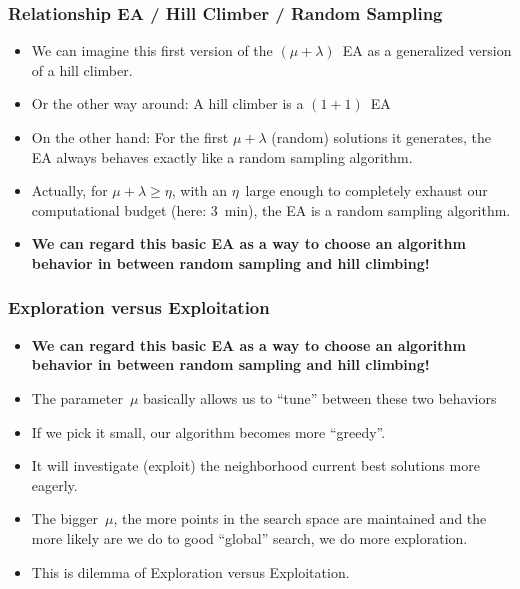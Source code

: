 \documentclass[mathserif]{beamer}%
\begin{document}
\begin{frame}[t]%
\frametitle{Relationship EA / Hill Climber / Random Sampling}%
\begin{itemize}%
\item We can imagine this first version of the $(\mu+\lambda)$~EA as a generalized version of a hill climber.%
\item<2-> Or the other way around: A hill climber is a $(1+1)$~EA%
%
\item<6-> On the other hand: For the first $\mu+\lambda$ (random) solutions it generates, the EA always behaves exactly like a random sampling algorithm.%
%
\item<8-> Actually, for $\mu+\lambda\geq \eta$, with an $\eta$~large enough to completely exhaust our computational budget (here: 3~min), the EA \alert{is} a random sampling algorithm.%
\item<9-> \textbf{\alert{We can regard this basic EA as a way to choose an algorithm behavior in between random sampling and hill climbing!}}%
\end{itemize}%
\end{frame}%
%
%
\begin{frame}[t]%
\frametitle{Exploration versus Exploitation}%
\begin{itemize}%
\item \textbf{\alert{We can regard this basic EA as a way to choose an algorithm behavior in between random sampling and hill climbing!}}%
\item<2-> The parameter~$\mu$ basically allows us to ``tune'' between these two behaviors\cite{WWCTL2016GVLSTIOPSOEAP}%
\item<3-> If we pick it small, our algorithm becomes more ``greedy''.%
\item<4-> It will investigate (\alert{exploit}) the neighborhood current best solutions more eagerly.%
\item<7-> The bigger~$\mu$, the more points in the search space are maintained and the more likely are we do to good ``global'' search, we do \alert{more exploration}. %
\item<9-> This is dilemma of \alert{Exploration versus Exploitation}.\cite{ES1998EA,WCT2012EOPABT,WZCN2009WIOD,WGOEB}%
\end{itemize}%
\end{frame}%
%
\end{document}
